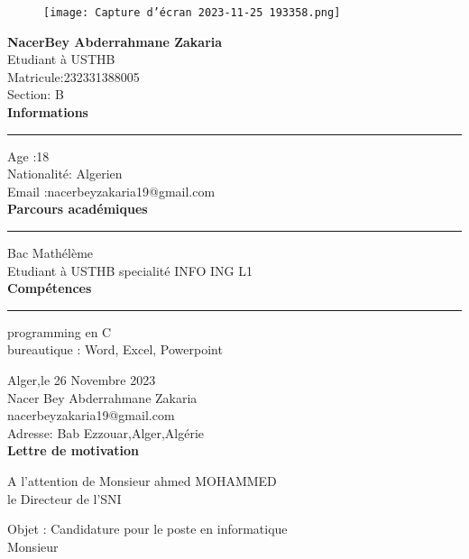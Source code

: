 \documentclass[a4paper, 11pt]{report}
\begin{document}
\begin{figure}[h!]
         \texttt{[image: Capture d'écran 2023-11-25 193358.png]}
         \end{figure}
\begin{flushleft}
   \Huge{\color{blue}\textbf{NacerBey Abderrahmane Zakaria}} \\

\Large{Etudiant à USTHB}\\
\normalsize{Matricule:232331388005\\
Section: B\\}
\vspace{2.5\baselineskip}
\Huge{\color{red}\textbf{Informations}}
\rule[0.5ex]{14cm}{1pt} 
\normalsize{Age :18\\
Nationalité: Algerien\\
Email :nacerbeyzakaria19@gmail.com}\\
\vspace{2\baselineskip}
\Huge{\color{red}\textbf{Parcours académiques}}
\rule[0.5ex]{14cm}{1pt}
\normalsize{Bac Mathélème\\
Etudiant à USTHB specialité INFO ING L1}\\
\vspace{2\baselineskip}
\Huge{\color{red}\textbf{Compétences}}
\rule[0.5ex]{14cm}{1pt}
\normalsize{programming en C\\
bureautique : Word, Excel, Powerpoint}


\end{flushleft}
\clearpage
\begin{flushleft}
    \normalsize{Alger,le 26 Novembre 2023}\\
\vspace{2\baselineskip}
Nacer Bey Abderrahmane Zakaria\\
nacerbeyzakaria19@gmail.com\\
Adresse: Bab Ezzouar,Alger,Algérie\\
\vspace{2\baselineskip}
\huge{\color{blue}\textbf{Lettre de motivation}}\\
\end{flushleft}
\normalsize{
\begin{flushright}
A l'attention de Monsieur ahmed MOHAMMED %
\\ le Directeur de l'SNI
\end{flushright}}
   Objet : Candidature pour le poste en informatique\\ 
Monsieur\\
\end{document}
